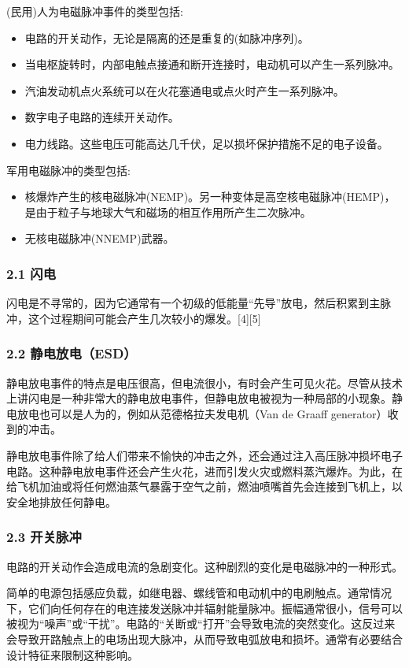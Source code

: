 (民用)人为电磁脉冲事件的类型包括:
\begin{itemize}
\item 电路的开关动作，无论是隔离的还是重复的(如脉冲序列)。
\item 当电枢旋转时，内部电触点接通和断开连接时，电动机可以产生一系列脉冲。
\item 汽油发动机点火系统可以在火花塞通电或点火时产生一系列脉冲。
\item 数字电子电路的连续开关动作。
\item 电力线路。这些电压可能高达几千伏，足以损坏保护措施不足的电子设备。
\end{itemize}

军用电磁脉冲的类型包括:
\begin{itemize}
\item 核爆炸产生的核电磁脉冲(NEMP)。另一种变体是高空核电磁脉冲(HEMP)，是由于粒子与地球大气和磁场的相互作用所产生二次脉冲。
\item 无核电磁脉冲(NNEMP)武器。
\end{itemize}
\subsubsection{2.1 闪电}
闪电是不寻常的，因为它通常有一个初级的低能量“先导”放电，然后积累到主脉冲，这个过程期间可能会产生几次较小的爆发。[4][5]
\subsubsection{2.2 静电放电（ESD）}
静电放电事件的特点是电压很高，但电流很小，有时会产生可见火花。尽管从技术上讲闪电是一种非常大的静电放电事件，但静电放电被视为一种局部的小现象。静电放电也可以是人为的，例如从范德格拉夫发电机（Van de Graaff generator）收到的冲击。

静电放电事件除了给人们带来不愉快的冲击之外，还会通过注入高压脉冲损坏电子电路。这种静电放电事件还会产生火花，进而引发火灾或燃料蒸汽爆炸。为此，在给飞机加油或将任何燃油蒸气暴露于空气之前，燃油喷嘴首先会连接到飞机上，以安全地排放任何静电。
\subsubsection{2.3 开关脉冲}
电路的开关动作会造成电流的急剧变化。这种剧烈的变化是电磁脉冲的一种形式。

简单的电源包括感应负载，如继电器、螺线管和电动机中的电刷触点。通常情况下，它们向任何存在的电连接发送脉冲并辐射能量脉冲。振幅通常很小，信号可以被视为“噪声”或“干扰”。电路的“关断或“打开”会导致电流的突然变化。这反过来会导致开路触点上的电场出现大脉冲，从而导致电弧放电和损坏。通常有必要结合设计特征来限制这种影响。

